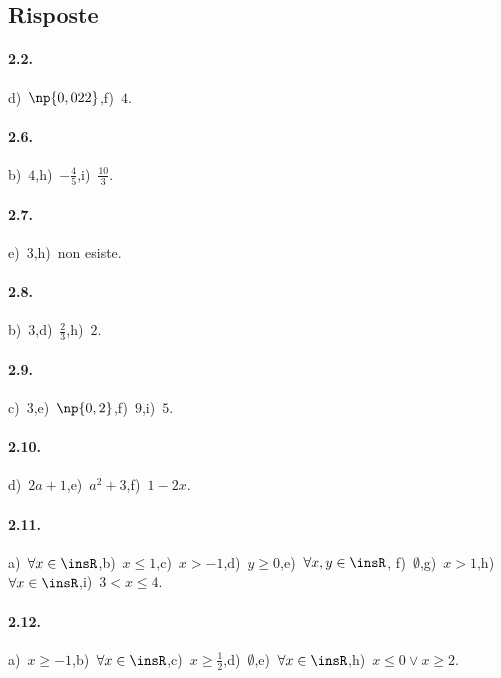 \subsection{Risposte}
\begin{multicols}{2}
\paragraph{2.2.}
d)~$\np{0,022}$,\quad f)~$4$.

\paragraph{2.6.}
b)~$4$,\quad h)~$-\frac{4}{5}$,\quad i)~$\frac{10}{3}$.

\paragraph{2.7.}
e)~$3$,\quad h)~non esiste.

\paragraph{2.8.}
b)~$3$,\quad d)~$\frac{2}{3}$,\quad h)~$2$.

\paragraph{2.9.}
c)~$3$,\quad e)~$\np{0,2}$,\quad f)~$9$,\quad i)~$5$.

\paragraph{2.10.}
d)~$2a+1$,\quad e)~$a^2+3$,\quad f)~$1-2x$.
\end{multicols}

\paragraph{2.11.}
a)~$\forall x\in \insR$,\quad b)~$x\le 1$,\quad c)~$x>-1$,\quad d)~$y\ge 0$,\quad e)~$\forall x,y\in  \insR$,
\quad f)~$\emptyset$,\quad g)~$x>1$,\quad h)~$\forall x\in \insR$,\quad i)~$3<x\le 4$.

\paragraph{2.12.}
a)~$x\ge -1$,\quad b)~$\forall x\in \insR$,\quad c)~$x\ge\frac{1}{2}$,\quad d)~$\emptyset$,\quad e)~$\forall x\in \insR$,\quad h)~$x\le 0 \vee x\ge 2$.

